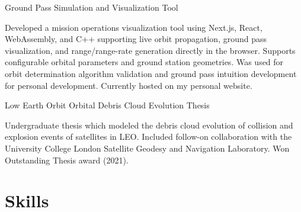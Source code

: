 \documentclass{techresume}
\begin{document}
\begin{project}{Ground Pass Simulation and Visualization Tool}
  \item Developed a mission operations visualization tool using Next.js, React, WebAssembly, and C++ supporting live orbit propagation, ground pass visualization, and range/range-rate generation directly in the browser. Supports configurable orbital parameters and ground station geometries. Was used for orbit determination algorithm validation and ground pass intuition development for personal development. Currently hosted on my personal website.
\end{project}

\begin{project}{Low Earth Orbit Orbital Debris Cloud Evolution Thesis}
  \item Undergraduate thesis which modeled the debris cloud evolution of collision and explosion events of satellites in LEO. Included follow-on collaboration with the University College London Satellite Geodesy and Navigation Laboratory. Won Outstanding Thesis award (2021).
\end{project}

\section{Skills}

\end{document}

